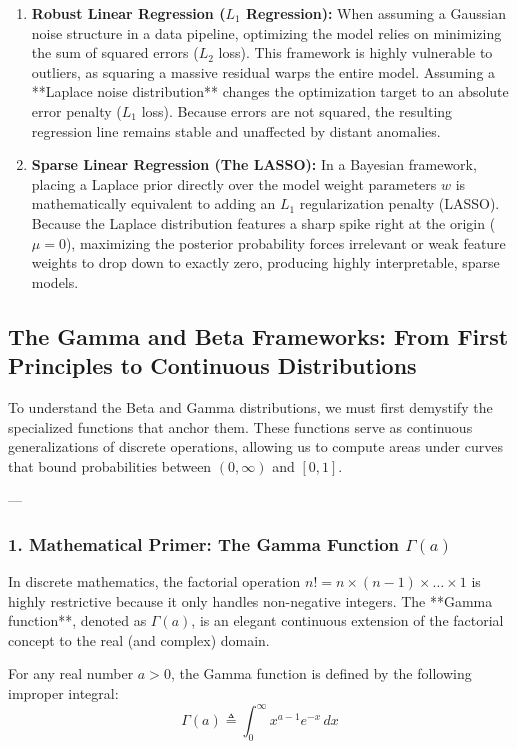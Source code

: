 \documentclass{article}
\begin{document}
\begin{enumerate}
    \item \textbf{Robust Linear Regression ($L_1$ Regression):} When assuming a Gaussian noise structure in a data pipeline, optimizing the model relies on minimizing the sum of squared errors ($L_2$ loss). This framework is highly vulnerable to outliers, as squaring a massive residual warps the entire model. Assuming a **Laplace noise distribution** changes the optimization target to an absolute error penalty ($L_1$ loss). Because errors are not squared, the resulting regression line remains stable and unaffected by distant anomalies.
    \item \textbf{Sparse Linear Regression (The LASSO):} In a Bayesian framework, placing a Laplace prior directly over the model weight parameters $w$ is mathematically equivalent to adding an $L_1$ regularization penalty (LASSO). Because the Laplace distribution features a sharp spike right at the origin ($\mu=0$), maximizing the posterior probability forces irrelevant or weak feature weights to drop down to exactly zero, producing highly interpretable, sparse models.
\end{enumerate}

\subsection*{The Gamma and Beta Frameworks: From First Principles to Continuous Distributions}

To understand the Beta and Gamma distributions, we must first demystify the specialized functions that anchor them. These functions serve as continuous generalizations of discrete operations, allowing us to compute areas under curves that bound probabilities between $(0, \infty)$ and $[0, 1]$.

---

\subsubsection*{1. Mathematical Primer: The Gamma Function $\Gamma(a)$}

In discrete mathematics, the factorial operation $n! = n \times (n-1) \times \dots \times 1$ is highly restrictive because it only handles non-negative integers. The **Gamma function**, denoted as $\Gamma(a)$, is an elegant continuous extension of the factorial concept to the real (and complex) domain.

For any real number $a > 0$, the Gamma function is defined by the following improper integral:
\begin{equation}
\Gamma(a) \triangleq \int_{0}^{\infty} x^{a-1} e^{-x} \, dx \tag{200}
\end{equation}
\end{document}
